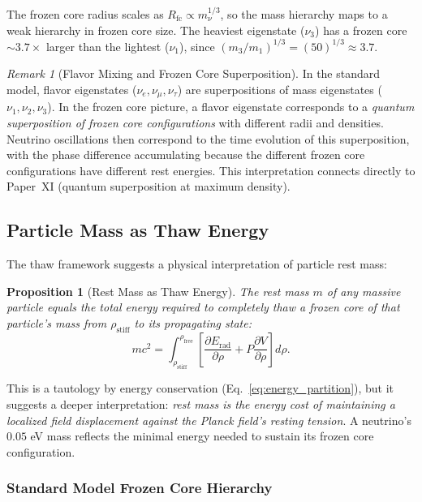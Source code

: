 \documentclass[11pt,a4paper]{article}
\newcommand{\rhostiff}{\ensuremath{\rho_{\mathrm{stiff}}}}
\newcommand{\Rfc}{\ensuremath{R_{\mathrm{fc}}}}
\newtheorem{proposition}[theorem]{Proposition}
\theoremstyle{definition}
\theoremstyle{remark}
\newtheorem{remark}[theorem]{Remark}
\begin{document}
The frozen core radius scales as $\Rfc \propto m_\nu^{1/3}$, so the mass hierarchy maps to a weak hierarchy in frozen core size. The heaviest eigenstate ($\nu_3$) has a frozen core $\sim 3.7\times$ larger than the lightest ($\nu_1$), since $(m_3/m_1)^{1/3} = (50)^{1/3} \approx 3.7$.

\begin{remark}[Flavor Mixing and Frozen Core Superposition]
In the standard model, flavor eigenstates ($\nu_e, \nu_\mu, \nu_\tau$) are superpositions of mass eigenstates ($\nu_1, \nu_2, \nu_3$). In the frozen core picture, a flavor eigenstate corresponds to a \emph{quantum superposition of frozen core configurations} with different radii and densities. Neutrino oscillations then correspond to the time evolution of this superposition, with the phase difference accumulating because the different frozen core configurations have different rest energies. This interpretation connects directly to Paper~XI (quantum superposition at maximum density).
\end{remark}

\subsection{Particle Mass as Thaw Energy}
\label{sec:mass_as_thaw}

The thaw framework suggests a physical interpretation of particle rest mass:

\begin{proposition}[Rest Mass as Thaw Energy]
\label{prop:mass_thaw}
The rest mass $m$ of any massive particle equals the total energy required to completely thaw a frozen core of that particle's mass from $\rhostiff$ to its propagating state:
\begin{equation}
mc^2 = \int_{\rhostiff}^{\rho_{\mathrm{free}}} \left[ \frac{\partial E_{\mathrm{rad}}}{\partial \rho} + P \frac{\partial V}{\partial \rho} \right] d\rho.
\end{equation}
\end{proposition}

This is a tautology by energy conservation (Eq.~\ref{eq:energy_partition}), but it suggests a deeper interpretation: \emph{rest mass is the energy cost of maintaining a localized field displacement against the Planck field's resting tension}. A neutrino's $0.05$ eV mass reflects the minimal energy needed to sustain its frozen core configuration.

\subsubsection{Standard Model Frozen Core Hierarchy}
\end{document}
